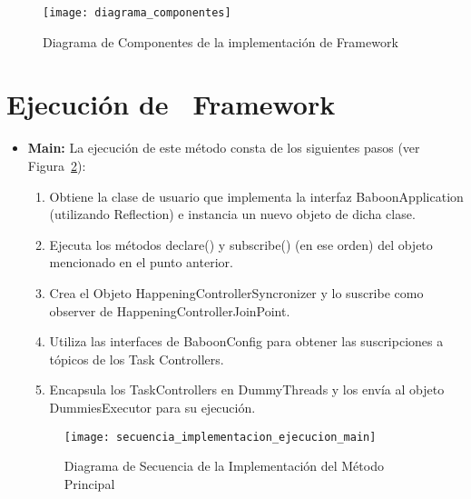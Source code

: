 \begin{figure}[H]
	\hspace{-1,60cm}
	\texttt{[image: diagrama\_componentes]}
	\caption{Diagrama de Componentes de la implementación de \nombreFramework
	Framework}
	\label{fig:diagrama_componentes}
\end{figure}


\section{Ejecución de \nombreFramework \ Framework}

\begin{itemize}
  \item \textbf{Main: } La ejecución de este método consta de
  los siguientes pasos (ver
  Figura~\ref{fig:diagrama_secuencia_implementacion_ejecucion_main}):
  	\begin{enumerate}
  	  \item Obtiene la clase de usuario que implementa la interfaz
  	  BaboonApplication (utilizando Reflection) e instancia un nuevo objeto de
  	  dicha clase.
  	  \item Ejecuta los métodos declare() y subscribe() (en ese orden) del
  	  objeto mencionado en el punto anterior.
  	  \item Crea el Objeto HappeningControllerSyncronizer y lo suscribe
  	  como observer de HappeningControllerJoinPoint.
  	  \item Utiliza las interfaces de BaboonConfig para obtener las
  	  suscripciones a tópicos de los Task Controllers.
  	  \item Encapsula los TaskControllers en DummyThreads y los envía al objeto
  	  DummiesExecutor para su ejecución.
  	\end{enumerate}
  	
 \begin{figure}[H]
	\hspace{-2,90cm}
	\texttt{[image: secuencia\_implementacion\_ejecucion\_main]}
	\caption{Diagrama de Secuencia de la Implementación del Método Principal}
	\label{fig:diagrama_secuencia_implementacion_ejecucion_main}
\end{figure}



\end{itemize}
